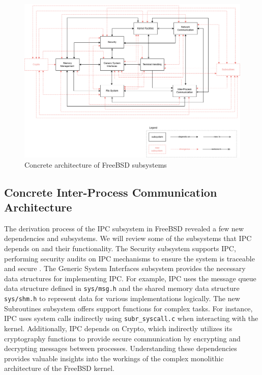 \documentclass[12pt, dvipsnames, a4paper]{article}
\newcommand{\code}[1]{\texttt{#1}}
\begin{document}
\begin{figure}[!htb]
	\center
	\includegraphics[width = 390pt]{assets/concrete-architecture.png}
	\caption{Concrete architecture of FreeBSD subsystems}
\end{figure}
\clearpage
\subsection{Concrete Inter-Process Communication Architecture}

The derivation process of the IPC subsystem in FreeBSD revealed a few new dependencies and subsystems. We will review some of the subsystems that IPC depends on and their functionality. The Security subsystem supports IPC, performing security audits on IPC mechanisms to ensure the system is traceable and secure \cite{audit}. The Generic System Interfaces subsystem provides the necessary data structures for implementing IPC. For example, IPC uses the message queue data structure defined in \code{sys/msg.h} and the shared memory data structure \code{sys/shm.h} to represent data for various implementations logically. The new Subroutines subsystem offers support functions for complex tasks. For instance, IPC uses system calls indirectly using \code{subr\_syscall.c} when interacting with the kernel. Additionally, IPC depends on Crypto, which indirectly utilizes its cryptography functions to provide secure communication by encrypting and decrypting messages between processes. Understanding these dependencies provides valuable insights into the workings of the complex monolithic architecture of the FreeBSD kernel.
\end{document}
